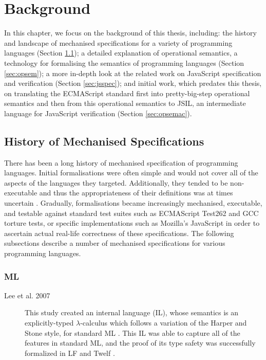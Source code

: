 \documentclass[a4paper,11pt,twoside]{report}
\begin{document}
\chapter{Background} \label{cha:bckgnd}
In this chapter, we focus on the background of this thesis, including: the history and landscape of mechanised specifications for a variety of programming languages (Section \ref{sec:hist}); a detailed explanation of operational semantics, a technology for formalising the semantics of programming languages (Section \ref{sec:opsem}); a more in-depth look at the related work on JavaScript specification and verification (Section \ref{sec:jsspec}); and initial work, which predates this thesis, on translating the ECMAScript standard first into pretty-big-step operational semantics and then from this operational semantics to JSIL, an intermediate language for JavaScript verification (Section \ref{sec:opsemac}).

\section{History of Mechanised Specifications}\label{sec:hist}
There has been a long history of mechanised specification of programming languages. Initial formalisations were often simple and would not cover all of the aspects of the languages they targeted. Additionally, they tended to be non-executable and thus the appropriateness of their definitions was at times uncertain \cite{Ellison:2012}. Gradually, formalisations became increasingly mechanised, executable, and testable against standard test suites such as ECMAScript Test262 and GCC torture tests, or specific implementations such as Mozilla's JavaScript in order to ascertain actual real-life correctness of these specifications. The following subsections describe a number of mechanised specifications for various programming languages.

\subsection{ML}
\begin{description}
\item[Lee et al. 2007] This study created an internal language (IL), whose semantics is an explicitly-typed $\lambda$-calculus which follows a variation of the Harper and Stone\cite{Harper:2000} style, for standard ML \cite{Lee:2007}. This IL was able to capture all of the features in standard ML, and the proof of its type safety was successfully formalized in LF \cite{Harper:1993} and Twelf \cite{Pfenning98guide}.
\end{description}
\end{document}

